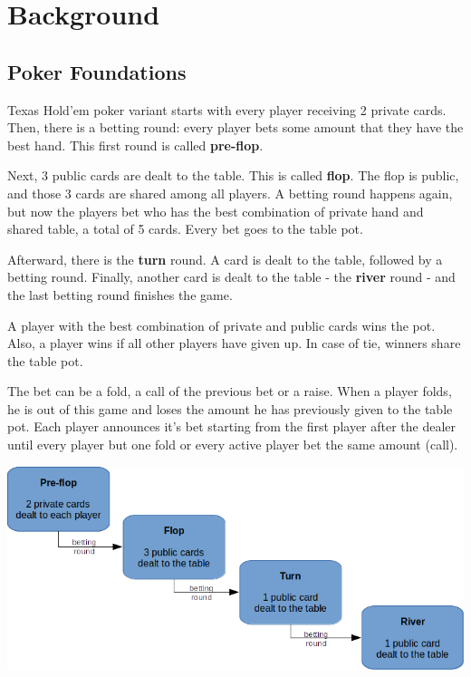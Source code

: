 \newpage

\chapter{Background}
\label{chap:background}

\section{Poker Foundations}
\label{sec:foundations}

Texas Hold'em poker variant starts with every player receiving 2 private cards. Then, there is a betting round: every player bets some amount that they have the best hand. This first round is called \textbf{pre-flop}.

Next, 3 public cards are dealt to the table. This is called \textbf{flop}. The flop is public, and those 3 cards are shared among all players. A betting round happens again, but now the players bet who has the best combination of private hand and shared table, a total of 5 cards. Every bet goes to the table pot.

Afterward, there is the \textbf{turn} round. A card is dealt to the table, followed by a betting round. Finally, another card is dealt to the table - the \textbf{river} round - and the last betting round finishes the game.

A player with the best combination of private and public cards wins the pot. Also, a player wins if all other players have given up. In case of tie, winners share the table pot.

The bet can be a fold, a call of the previous bet or a raise. When a player folds, he is out of this game and loses the amount he has previously given to the table pot. Each player announces it's bet starting from the first player after the dealer until every player but one fold or every active player bet the same amount (call). 

\vspace{2cm}
\includegraphics[scale=2]{poker-foundations}
\vspace{0.5cm}

